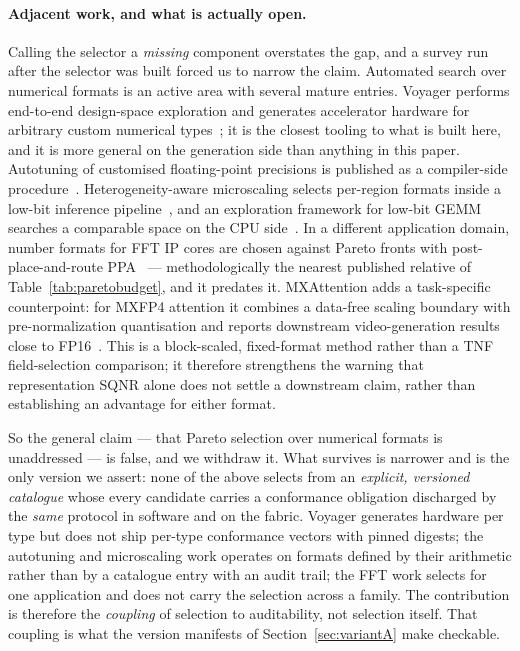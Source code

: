 \paragraph{Adjacent work, and what is actually open.}
Calling the selector a \emph{missing} component overstates the gap, and a survey
run after the selector was built forced us to narrow the claim. Automated search
over numerical formats is an active area with several mature entries. Voyager
performs end-to-end design-space exploration and generates accelerator hardware
for arbitrary custom numerical types~\cite{prabhu2026voyager}; it is the closest
tooling to what is built here, and it is more general on the generation side than
anything in this paper. Autotuning of customised floating-point precisions is
published as a compiler-side procedure~\cite{chen2026autotuning}. Heterogeneity-aware
microscaling selects per-region formats inside a low-bit inference
pipeline~\cite{ada2026mx}, and an exploration framework for low-bit GEMM searches
a comparable space on the CPU side~\cite{exagemm2026}. In a different application
domain, number formats for FFT IP cores are chosen against Pareto fronts with
post-place-and-route PPA~\cite{fftformats2026} --- methodologically the nearest
published relative of Table~\ref{tab:paretobudget}, and it predates it.
MXAttention adds a task-specific counterpoint: for MXFP4 attention it combines a
data-free scaling boundary with pre-normalization quantisation and reports
downstream video-generation results close to FP16~\cite{yu2026mxattention}.
This is a block-scaled, fixed-format method rather than a TNF field-selection
comparison; it therefore strengthens the warning that representation SQNR alone
does not settle a downstream claim, rather than establishing an advantage for
either format.

So the general claim --- that Pareto selection over numerical formats is
unaddressed --- is false, and we withdraw it. What survives is narrower and is the
only version we assert: none of the above selects from an \emph{explicit,
versioned catalogue} whose every candidate carries a conformance obligation
discharged by the \emph{same} protocol in software and on the fabric. Voyager
generates hardware per type but does not ship per-type conformance vectors with
pinned digests; the autotuning and microscaling work operates on formats defined
by their arithmetic rather than by a catalogue entry with an audit trail; the FFT
work selects for one application and does not carry the selection across a family.
The contribution is therefore the \emph{coupling} of selection to auditability, not
selection itself. That coupling is what the version manifests of
Section~\ref{sec:variantA} make checkable.

